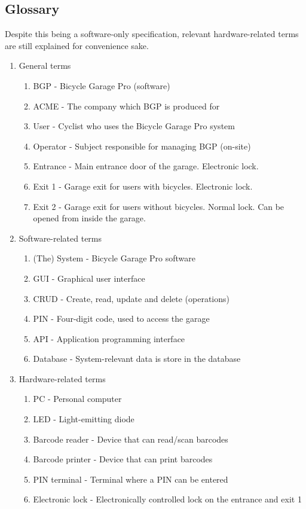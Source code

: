 \documentclass[12pt,titlepage,bibliography=totoc]{article}
\begin{document}
\subsection{Glossary}
Despite this being a software-only specification, relevant hardware-related terms are still explained for convenience sake.
\begin{enumerate}
	\item General terms
	\begin{enumerate}
		\item BGP - Bicycle Garage Pro (software)
		\item ACME - The company which BGP is produced for
		\item User - Cyclist who uses the Bicycle Garage Pro system
		\item Operator - Subject responsible for managing BGP (on-site)
		\item Entrance - Main entrance door of the garage. Electronic lock.
		\item Exit 1 - Garage exit for users with bicycles. Electronic lock.
		\item Exit 2 - Garage exit for users without bicycles. Normal lock. Can be opened from inside the garage.
	\end{enumerate}

	\item Software-related terms
	\begin{enumerate}
		\item (The) System - Bicycle Garage Pro software
		\item GUI - Graphical user interface
		\item CRUD - Create, read, update and delete (operations)
		\item PIN - Four-digit code, used to access the garage
		\item API - Application programming interface
		\item Database - System-relevant data is store in the database
	\end{enumerate}

	\item Hardware-related terms
	\begin{enumerate}
		\item PC - Personal computer
		\item LED - Light-emitting diode
		\item Barcode reader - Device that can read/scan barcodes
		\item Barcode printer - Device that can print barcodes
		\item PIN terminal - Terminal where a PIN can be entered
		\item Electronic lock - Electronically controlled lock on the entrance and exit 1
	\end{enumerate}
\end{enumerate}
\end{document}
